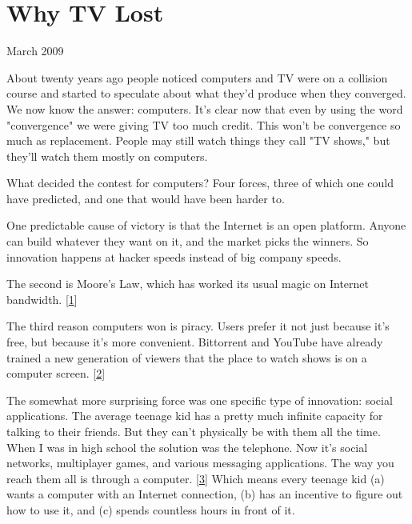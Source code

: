 \chapter{Why TV Lost}


            
              
                

March 2009

About twenty years ago people noticed
                  computers and TV were on a collision course and started to
                  speculate about what they'd produce when they converged. We
                  now know the answer: computers. It's clear now that even by
                  using the word "convergence" we were giving TV too much
                  credit. This won't be convergence so much as replacement.
                  People may still watch things they call "TV shows," but
                  they'll watch them mostly on computers.

What
                  decided the contest for computers? Four forces, three of which
                  one could have predicted, and one that would have been harder
                  to.

One predictable cause of victory is that the
                  Internet is an open platform. Anyone can build whatever they
                  want on it, and the market picks the winners. So innovation
                  happens at hacker speeds instead of big company speeds.

The
                  second is Moore's Law, which has worked its usual magic on
                  Internet bandwidth.
                  [\href{\#f1n}{1}]

The third reason computers won is piracy. Users
                  prefer it not just because it's free, but because it's more
                  convenient. Bittorrent and YouTube have already trained a new
                  generation of viewers that the place to watch shows is on a
                  computer screen.
                  [\href{\#f2n}{2}]

The somewhat more surprising force was one
                  specific type of innovation: social applications. The average
                  teenage kid has a pretty much infinite capacity for talking to
                  their friends. But they can't physically be with them all the
                  time. When I was in high school the solution was the
                  telephone. Now it's social networks, multiplayer games, and
                  various messaging applications. The way you reach them all is
                  through a computer.
                  [\href{\#f3n}{3}]
                  Which means every teenage kid (a) wants a computer with an
                  Internet connection, (b) has an incentive to figure out how to
                  use it, and (c) spends countless hours in front of it.

